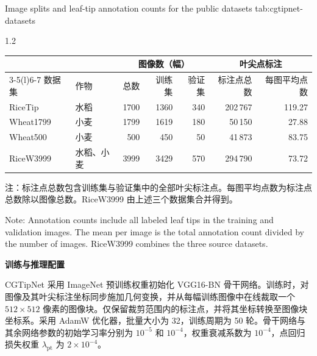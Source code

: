 \begin{table}[H]
  \centering
    {Image splits and leaf-tip annotation counts for the public datasets}
    {tab:cgtipnet-datasets}
  \begin{spacing}{1.2}
    \normalfont{}
    \setlength{\tabcolsep}{5pt}
    \renewcommand{\arraystretch}{1.15}
    \begin{tabular}{@{}llrrrrr@{}}
      \toprule
      & & \multicolumn{3}{c}{图像数（幅）} & \multicolumn{2}{c}{叶尖点标注} \\
      \cmidrule(lr){3-5}\cmidrule(l){6-7}
      数据集 & 作物 & 总数 & 训练集 & 验证集 & 标注点总数 & 每图平均点数 \\
      \midrule
      RiceTip   & 水稻 & 1700 & 1360 & 340 & 202\,767 & 119.27 \\
      Wheat1799 & 小麦 & 1799 & 1619 & 180 &  50\,150 &  27.88 \\
      Wheat500  & 小麦 &  500 &  450 &  50 &  41\,873 &  83.75 \\
      \midrule
      RiceW3999 & 水稻、小麦 & 3999 & 3429 & 570 & 294\,790 & 73.72 \\
      \bottomrule
    \end{tabular}\par
    \vspace{8pt}
    {\raggedright
     \noindent 注：标注点总数包含训练集与验证集中的全部叶尖标注点。每图平均点数为标注点总数除以图像总数。RiceW3999 由上述三个数据集合并得到。\par
     \vspace{2pt}
     \noindent Note: Annotation counts include all labeled leaf tips in the training and validation images. The mean per image is the total annotation count divided by the number of images. RiceW3999 combines the three source datasets.\par}
  \end{spacing}
\end{table}


\par\medskip\noindent\textbf{训练与推理配置}\par
CGTipNet 采用 ImageNet 预训练权重初始化 VGG16-BN 骨干网络。训练时，对图像及其叶尖标注坐标同步施加几何变换，并从每幅训练图像中在线裁取一个 \(512\times512\) 像素的图像块。仅保留裁剪范围内的标注点，并将其坐标转换至图像块坐标系。采用 AdamW 优化器，批量大小为 32，训练周期为 50 轮。骨干网络与其余网络参数的初始学习率分别为 \(10^{-5}\) 和 \(10^{-4}\)，权重衰减系数为 \(10^{-4}\)，点回归损失权重 \(\lambda_{\mathrm{pt}}\) 为 \(2\times10^{-4}\)。\par

